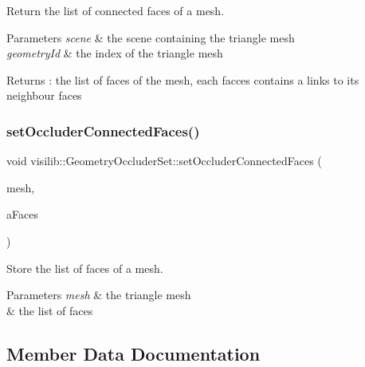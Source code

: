 Return the list of connected faces of a mesh. 


\begin{DoxyParams}{Parameters}
{\em scene} & the scene containing the triangle mesh \\
\hline
{\em geometry\+Id} & the index of the triangle mesh \\
\hline
\end{DoxyParams}
\begin{DoxyReturn}{Returns}
\+: the list of faces of the mesh, each facces contains a links to its neighbour faces 
\end{DoxyReturn}
\mbox{\label{classvisilib_1_1_geometry_occluder_set_a4700b3241185a0c1064a2a227d771d99}} 
\subsubsection{\texorpdfstring{setOccluderConnectedFaces()}{setOccluderConnectedFaces()}}
{\footnotesize\ttfamily void visilib\+::\+Geometry\+Occluder\+Set\+::set\+Occluder\+Connected\+Faces (\begin{DoxyParamCaption}\item[{\mbox{\hyperlink{structvisilib_1_1_discrete_geometry_description}{Discrete\+Geometry\+Description}} $\ast$}]{mesh,  }\item[{std\+::vector$<$ \mbox{\hyperlink{classvisilib_1_1_silhouette_mesh_face}{Silhouette\+Mesh\+Face}} $>$ \&}]{a\+Faces }\end{DoxyParamCaption})\hspace{0.3cm}{\ttfamily [inline]}}



Store the list of faces of a mesh. 


\begin{DoxyParams}{Parameters}
{\em mesh} & the triangle mesh \\
\hline
{\em } & the list of faces \\
\hline
\end{DoxyParams}


\subsection{Member Data Documentation}
\mbox{\label{classvisilib_1_1_geometry_occluder_set_a96611893ad5c36867c415cf68cd320c4}} 
